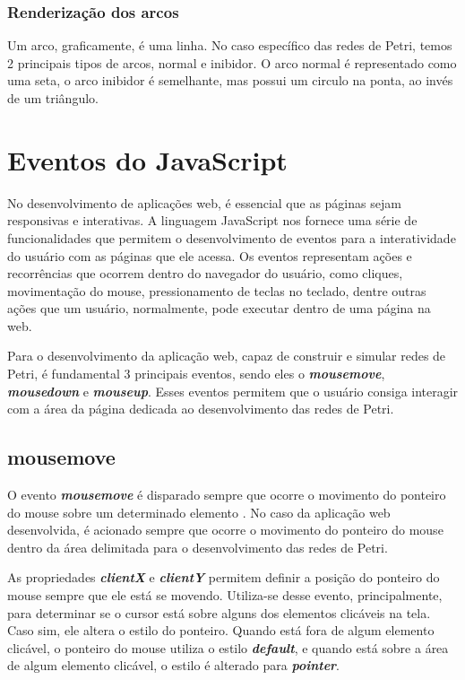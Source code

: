 \documentclass[
	12pt,				%
	openright,			%
	oneside,			%
	a4paper,			%
	english,			%
	brazil				%
	]{abntex2}
\begin{document}
\subsubsection*{Renderização dos arcos}

Um arco, graficamente, é uma linha. No caso específico das redes de Petri, temos 2 principais tipos de arcos, normal e inibidor. O arco normal é representado como uma seta, o arco inibidor é semelhante, mas possui um circulo na ponta, ao invés de um triângulo. 

\section{Eventos do JavaScript}

No desenvolvimento de aplicações web, é essencial que as páginas sejam responsivas e interativas. A linguagem JavaScript nos fornece uma série de funcionalidades que permitem o desenvolvimento de eventos para a interatividade do usuário com as páginas que ele acessa. Os eventos representam ações e recorrências que ocorrem dentro do navegador do usuário, como cliques, movimentação do mouse, pressionamento de teclas no teclado, dentre outras ações que um usuário, normalmente, pode executar dentro de uma página na web. 

Para o desenvolvimento da aplicação web, capaz de construir e simular redes de Petri, é fundamental 3 principais eventos, sendo eles o \textbf{\textit{mousemove}}, \textbf{\textit{mousedown}} e \textbf{\textit{mouseup}}. Esses eventos permitem que o usuário consiga interagir com a área da página dedicada ao desenvolvimento das redes de Petri. 

\subsection*{mousemove}

O evento \textbf{\textit{mousemove}} é disparado sempre que ocorre o movimento do ponteiro do mouse sobre um determinado elemento \cite{mdn_mousemove_event}. No caso da aplicação web desenvolvida, é acionado sempre que ocorre o movimento do ponteiro do mouse dentro da área delimitada para o desenvolvimento das redes de Petri. 



As propriedades \textbf{\textit{clientX}} e \textbf{\textit{clientY}} permitem definir a posição do ponteiro do mouse sempre que ele está se movendo. Utiliza-se desse evento, principalmente, para determinar se o cursor está sobre alguns dos elementos clicáveis na tela. Caso sim, ele altera o estilo do ponteiro. Quando está fora de algum elemento clicável, o ponteiro do mouse utiliza o estilo \textbf{\textit{default}}, e quando está sobre a área de algum elemento clicável, o estilo é alterado para \textbf{\textit{pointer}}.
\end{document}

